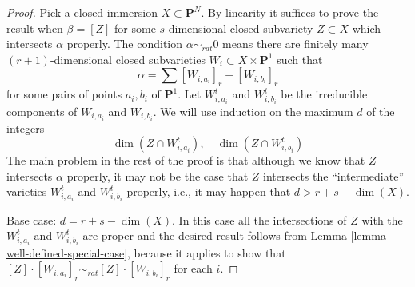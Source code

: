 \documentclass{stacks-project}
\theoremstyle{plain}
\theoremstyle{definition}
\theoremstyle{remark}
\numberwithin{equation}{subsection}
\begin{document}
\begin{proof}
Pick a closed immersion $X \subset \mathbf{P}^N$.
By linearity it suffices to prove the result when $\beta = [Z]$ for some
$s$-dimensional closed subvariety $Z \subset X$ which intersects $\alpha$
properly. The condition $\alpha \sim_{rat} 0$ means there
are finitely many $(r + 1)$-dimensional closed subvarieties
$W_i \subset X \times \mathbf{P}^1$ such that
$$
\alpha = \sum [W_{i, a_i}]_r - [W_{i, b_i}]_r
$$
for some pairs of points $a_i, b_i$ of $\mathbf{P}^1$.
Let $W_{i, a_i}^t$ and $W_{i, b_i}^t$ be the irreducible components
of $W_{i, a_i}$ and $W_{i, b_i}$.
We will use induction on the maximum $d$ of the integers
$$
\dim(Z \cap W_{i, a_i}^t),\quad \dim(Z \cap W_{i, b_i}^t)
$$
The main problem in the rest of the proof is that although we know that $Z$
intersects $\alpha$ properly, it may not be the case that $Z$ intersects the
``intermediate'' varieties $W_{i, a_i}^t$
and $W_{i, b_i}^t$ properly, i.e., it may happen that $d >  r + s - \dim(X)$.

\medskip\noindent
Base case: $d = r + s - \dim(X)$. In this case all the intersections of
$Z$ with the $W_{i, a_i}^t$ and $W_{i, b_i}^t$ are proper and the
desired result follows from Lemma \ref{lemma-well-defined-special-case},
because it applies to show that
$[Z] \cdot [W_{i, a_i}]_r \sim_{rat} [Z] \cdot [W_{i, b_i}]_r$ for
each $i$.


\end{proof}
\end{document}
